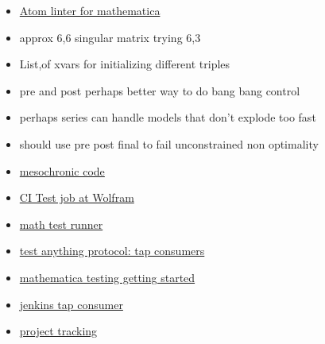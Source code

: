 \documentclass[hyperref]{labbook}
\begin{document}

\begin{itemize}
\item \href{https://atom.io/packages/linter-mathematica}{Atom linter for mathematica}
\end{itemize}

\begin{itemize}
\item approx 6,6 singular matrix  trying 6,3
\end{itemize}

\begin{itemize}
\item List,of xvars for initializing different triples
\item pre and post perhaps better way to do bang bang control
\item perhaps series can handle models that don't explode too fast
\item should use pre post final to fail unconstrained non optimality
\end{itemize}

\begin{itemize}
\item \href{http://people.clarkson.edu/~mbudisic/software.html}{mesochronic code}
\end{itemize}

  \begin{itemize}
  \item \href{https://www.wolfram.com/company/careers/opportunities/#op-94325-software-developer-in-test}{CI Test job at Wolfram}
  \item \href{https://github.com/lynchs61/Mathematica-Test-Runner}{math test runner}
  \item \href{https://testanything.org/consumers.html}{test anything protocol: tap consumers}
  \item \href{http://reference.wolfram.com/language/tutorial/UsingTheTestingFramework.html}{mathematica testing getting started}
  \item \href{https://wiki.jenkins.io/display/JENKINS/TAP+Plugin}{jenkins tap consumer }
  \item \href{https://www.atlassian.com/software/jira}{project tracking}
  \end{itemize}


\end{document}
